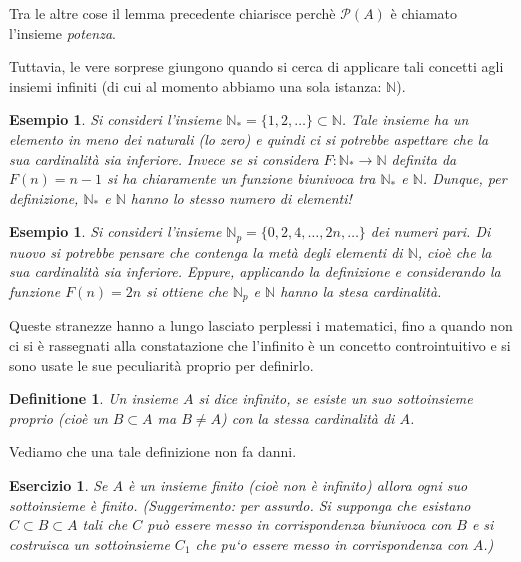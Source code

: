 \documentclass{amsart}
\newtheorem{defin}[thm]{Definitione}
\newtheorem{exmp}[thm]{Esempio}
\newtheorem{es}[thm]{Esercizio}
\newcommand\Pa{{\mathcal P}}
\newcommand\N{{\mathbb N}}
\begin{document}
Tra le altre cose il lemma precedente chiarisce perch\`e $\Pa(A)$ \`e
chiamato l'insieme \emph{potenza}.

Tuttavia, le vere sorprese giungono
quando si cerca di applicare tali concetti agli insiemi infiniti (di
cui al momento abbiamo una sola istanza: $\N$).
\begin{exmp}\label{ex:2}
Si consideri l'insieme $\N_*=\{1,2,\dots\}\subset\N$. Tale insieme ha
un elemento in meno dei naturali (lo zero) e quindi ci si potrebbe
aspettare che la sua cardinalit\`a sia inferiore. Invece se si
considera $F:\N_*\to\N$ definita da $F(n)=n-1$ si ha chiaramente un
funzione biunivoca tra $\N_*$ e $\N$. Dunque, per definizione, $\N_*$ e
$\N$ hanno lo stesso numero di elementi! 
\end{exmp}

\begin{exmp}\label{ex:3}
Si consideri l'insieme $\N_p=\{0,2,4,\dots, 2n,\dots\}$ dei numeri
pari. Di nuovo si potrebbe pensare che contenga la met\`a degli
elementi di $\N$, cio\`e che la sua cardinalit\`a sia
inferiore. Eppure, applicando la definizione e considerando la funzione
$F(n)=2n$ si ottiene che $\N_p$ e $\N$ hanno la stesa cardinalit\`a.
\end{exmp}
Queste stranezze hanno a lungo lasciato perplessi i matematici, fino a
quando non ci si \`e rassegnati alla constatazione che l'infinito \`e
un concetto controintuitivo e si sono usate le sue peculiarit\`a
proprio per definirlo.

\begin{defin}\label{def:infy}
Un insieme $A$ si dice \emph{infinito}, se esiste un suo sottoinsieme
proprio (cio\`e un $B\subset A$ ma $B\neq A$) con la stessa
cardinalit\`a di $A$.
\end{defin}
Vediamo che una tale definizione non fa danni.
\begin{es}\label{es:ff}
Se $A$ \`e un insieme finito (cio\`e non \`e infinito) allora ogni suo
sottoinsieme \`e finito. (Suggerimento: per assurdo. Si
supponga che esistano $C\subset B\subset A$ tali che $C$ pu\`o essere messo in
corrispondenza biunivoca con $B$ e si costruisca un sottoinsieme $C_1$
che pu`o essere messo in corrispondenza con $A$.)
\end{es}
\end{document}
